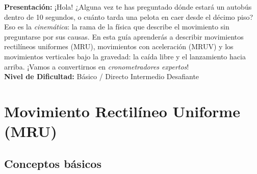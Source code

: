 \documentclass[12pt, letterpaper]{article}
\begin{document}


\vspace{4pt}
\begin{cuadroinfo}
  \small
  \textbf{Presentación:} ¡Hola! ¿Alguna vez te has preguntado dónde estará un autobús dentro de 10 segundos, o cuánto tarda una pelota en caer desde el décimo piso? Eso es la \emph{cinemática}: la rama de la física que describe el movimiento sin preguntarse por sus causas. En esta guía aprenderás a describir movimientos rectilíneos uniformes (MRU), movimientos con aceleración (MRUV) y los movimientos verticales bajo la gravedad: la caída libre y el lanzamiento hacia arriba. ¡Vamos a convertirnos en \emph{cronometradores expertos}!
  \\[4pt]
  \textbf{Nivel de Dificultad:}\quad
  \facil{} Básico / Directo \quad
  \medio{} Intermedio \quad
  \dificil{} Desafiante
\end{cuadroinfo}

\vspace{8pt}

\section{Movimiento Rectilíneo Uniforme (MRU)}

\subsection{Conceptos básicos}
\end{document}
